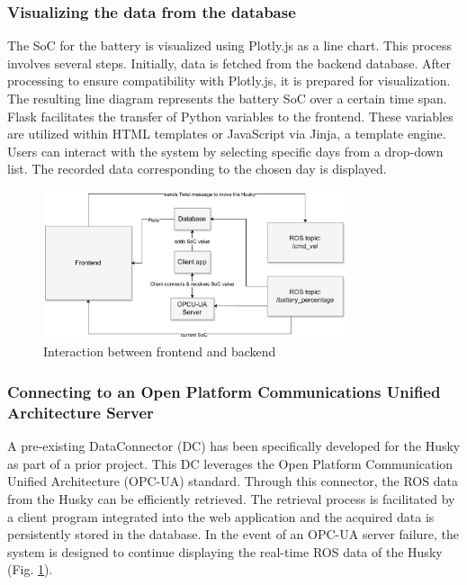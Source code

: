 \documentclass[conference]{IEEEtran}
\begin{document}
\subsubsection{Visualizing the data from the database}
The SoC for the battery is visualized using Plotly.js as a line chart. This process involves several steps. Initially, data is fetched from the backend database. After processing to ensure compatibility with Plotly.js, it is prepared for visualization. The resulting line diagram represents the battery SoC over a certain time span. Flask facilitates the transfer of Python variables to the frontend. 
These variables are utilized within HTML templates or JavaScript via Jinja, a template engine. Users can interact with the system by selecting specific days from a drop-down list. The recorded data corresponding to the chosen day is displayed.
\begin{figure}[tp]
    \centerline{\includegraphics[width=8.9cm]{Pictures/backfront.pdf}}
    \caption{Interaction between frontend and backend}
    \label{fig:backfront}
\end{figure}
\subsubsection{Connecting to an Open Platform Communications Unified Architecture Server}
A pre-existing DataConnector (DC) has been specifically developed for the Husky as part of a prior project. This DC leverages the Open Platform Communication Unified Architecture (OPC-UA) standard. Through this connector, the ROS data from the Husky can be efficiently retrieved. The retrieval process is facilitated by a client program integrated into the web application and the acquired data is persistently stored in the database. 
In the event of an OPC-UA server failure, the system is designed to continue displaying the real-time ROS data of the Husky (Fig. \ref{fig:backfront}).
\end{document}
